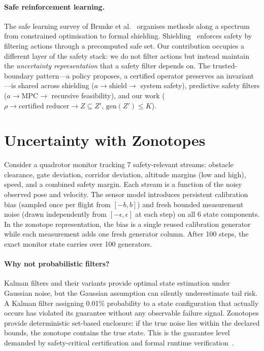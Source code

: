 \documentclass{article}
\begin{document}
\paragraph{Safe reinforcement learning.}
The safe learning survey of Brunke et al.~\cite{Brunke2022} organises methods along a spectrum from constrained optimisation to formal shielding.
Shielding~\cite{Alshiekh2018} enforces safety by filtering actions through a precomputed safe set.
Our contribution occupies a different layer of the safety stack: we do not filter actions but instead maintain the \emph{uncertainty representation} that a safety filter depends on.
The trusted-boundary pattern---a policy proposes, a certified operator preserves an invariant---is shared across shielding ($a \to \text{shield} \to$ system safety), predictive safety filters ($a \to \text{MPC} \to$ recursive feasibility), and our work ($\rho \to \text{certified reducer} \to Z \subseteq Z'$, $\mathrm{gen}(Z') \leq K$).


\section{Uncertainty with Zonotopes}\label{sec:motivation}

Consider a quadrotor monitor tracking 7 safety-relevant streams: obstacle clearance, gate deviation, corridor deviation, altitude margins (low and high), speed, and a combined safety margin.
Each stream is a function of the noisy observed pose and velocity.
The sensor model introduces persistent calibration bias (sampled once per flight from $[-b, b]$) and fresh bounded measurement noise (drawn independently from $[-\epsilon, \epsilon]$ at each step) on all 6 state components.
In the zonotope representation, the bias is a single reused calibration generator while each measurement adds one fresh generator column.
After 100 steps, the exact monitor state carries over 100 generators.

\paragraph{Why not probabilistic filters?}
Kalman filters and their variants provide optimal state estimation under Gaussian noise, but the Gaussian assumption can silently underestimate tail risk.
A Kalman filter assigning 0.01\% probability to a state configuration that actually occurs has violated its guarantee without any observable failure signal.
Zonotopes provide deterministic set-based enclosure: if the true noise lies within the declared bounds, the zonotope contains the true state.
This is the guarantee level demanded by safety-critical certification and formal runtime verification~\cite{Finkbeiner2025}.
\end{document}
